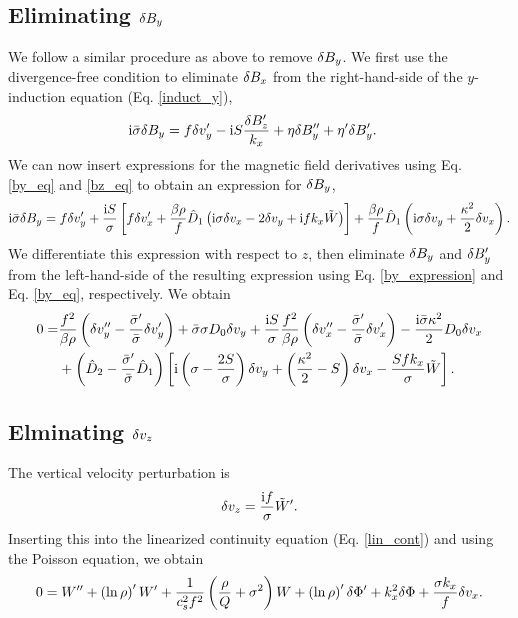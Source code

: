 \subsection{Eliminating $\delta B_y$}
We follow a similar procedure as above to remove $\delta B_y$. We first use
the divergence-free condition to eliminate $\delta B_x$ from the
right-hand-side of the $y$-induction equation (Eq. \ref{induct_y}),
\begin{align}
  &\mathrm{i}\bar{\sigma}\delta B_y = f\delta v_y^\prime - \mathrm{i}
  S\frac{\delta B_z^\prime}{k_x} +
  \eta\delta B_y^{\prime\prime}+\eta^\prime\delta B_y^\prime.  
\end{align}
We can now insert expressions for the magnetic field derivatives using
Eq. \ref{by_eq} and \ref{bz_eq} to obtain an expression for $\delta B_y$, 
\begin{align}
  \mathrm{i}\bar{\sigma}\delta B_y = f \delta v_y^\prime + \frac{\mathrm{i} S}{\sigma}\left[
    f\delta v_x^\prime + \frac{\beta\rho}{f}\hat{D}_1\left(\mathrm{i}\sigma\delta v_x -
  2\delta v_y + \mathrm{i} f k_x\tilde{W} \right)\right] +
  \frac{\beta\rho}{f}\hat{D}_1\left(\mathrm{i}\sigma\delta v_y +
  \frac{\kappa^2}{2}\delta v_x\right). \label{by_expression}
\end{align}
We differentiate this expression with respect to $z$, then eliminate 
$\delta B_y$ and  $\delta B_y^\prime$ from the left-hand-side of the resulting
expression using Eq. \ref{by_expression} and 
Eq. \ref{by_eq}, respectively. We obtain
\begin{align}
  0 =& \frac{f^2}{\beta\rho}\left(\delta v_y^{\prime\prime} -
  \frac{\bar{\sigma}^\prime}{\bar{\sigma}}\delta v_y^\prime\right) 
  + \bar{\sigma}\sigma D_0\delta v_y  + \frac{\mathrm{i} 
    S}{\sigma}\frac{f^2}{\beta\rho}\left(\delta v_x^{\prime\prime} -
    \frac{\bar{\sigma}^\prime}{\bar{\sigma}}\delta v_x^\prime\right) -
    \frac{\mathrm{i}\bar{\sigma}\kappa^2}{2}D_0\delta v_x \notag\\
    & + \left(\hat{D}_2 -
    \frac{\bar{\sigma}^\prime}{\bar{\sigma}}\hat{D}_1\right)\left[\mathrm{i}\left(\sigma
      - \frac{2S}{\sigma}\right)\delta v_y + \left(\frac{\kappa^2}{2} -
      S\right)\delta v_x - \frac{Sfk_x}{\sigma}\tilde{W}\right]. \label{final_vy}
\end{align}

\subsection{Elminating $\delta v_z$}
The vertical velocity perturbation is
\begin{align}
  \delta v_z = \frac{\mathrm{i} f}{\sigma}\tilde{W}^\prime. 
\end{align}
Inserting this into the linearized continuity equation
(Eq. \ref{lin_cont}) and using the Poisson equation, we obtain
\begin{align}
0=  W^{\prime\prime} + \left(\ln{\rho}\right)^\prime W^\prime +
  \frac{1}{c_s^2f^2}\left(\frac{\rho}{Q} + \sigma^2\right)W +
  \left(\ln{\rho}\right)^\prime\delta \Phi^\prime + k_x^2\delta \Phi + \frac{\sigma
  k_x}{f}\delta v_x.\label{final_w}
\end{align}
